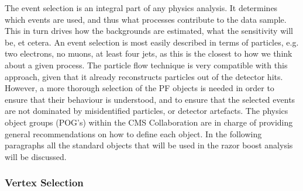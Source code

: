 The event selection is an integral part of any physics analysis. It determines which events are
used, and thus what processes contribute to the data sample. This in turn drives how the
backgrounds are estimated, what the sensitivity will be, et cetera. 
An event selection is most easily described in terms of particles, e.g. two electrons, no muons, at
least four jets, as this is the closest to how we think about a given process.  
The particle flow technique is very compatible with this approach, given that it already
reconstructs particles out of the detector hits. 
However, a more thorough selection of the PF objects is needed in order to ensure that their
behaviour is understood, and to ensure that the selected events are not dominated by
misidentified particles, or detector artefacts. 
The physics object groups (POG's) within the CMS Collaboration are in charge of providing general
recommendations on how to define each object. 
In the following paragraphs all the standard objects that will be used in the razor boost analysis
will be discussed.

% 



\subsubsection{Vertex Selection \label{sec:object_vertex}}

